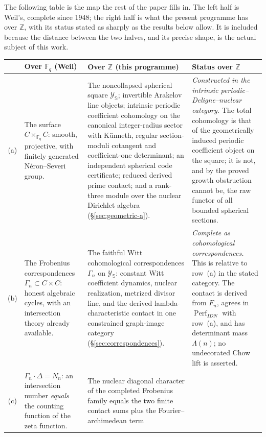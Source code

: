 \documentclass[11pt]{amsart}
\theoremstyle{definition}
\theoremstyle{remark}
\newcommand{\Z}{\mathbb Z}
\begin{document}
The following table is the map the rest of the paper fills in.  The left
half is Weil's, complete since 1948; the right half is what the present
programme has over $\Z$, with its status stated as sharply as the results
below allow.  It is included because the distance between the two halves,
and its precise shape, is the actual subject of this work.

\begingroup
\footnotesize
\setlength{\tabcolsep}{4pt}
\renewcommand{\arraystretch}{1.25}
\noindent
\begin{tabularx}{\textwidth}{@{}c p{} p{} Y@{}}
\toprule
 & \textbf{Over $\mathbb F_q$ (Weil)} & \textbf{Over $\Z$ (this programme)}
 & \textbf{Status over $\Z$} \\
\midrule
(a) &
The surface $C\times_{\mathbb F_q}C$: smooth, projective, with finitely
generated Néron--Severi group. &
The noncollapsed spherical square $\mathscr Y_{\mathbb S}$; invertible
Arakelov line objects; intrinsic periodic coefficient cohomology on the
canonical integer-radius sector with
K\"unneth, regular section-moduli cotangent and coefficient-one determinant;
an independent spherical code certificate; reduced derived prime contact; and a
rank-three module over the nuclear Dirichlet algebra
(\S\ref{sec:geometric-a}). &
\emph{Constructed in the intrinsic periodic--Deligne--nuclear category.}
The total cohomology is that of the geometrically induced periodic
coefficient object on the square; it is not, and by the proved growth
obstruction cannot be, the raw functor of all bounded spherical sections.
\\
\addlinespace
(b) &
The Frobenius correspondences $\Gamma_n\subset C\times C$: honest algebraic
cycles, with an intersection theory already available. &
The faithful Witt cohomological correspondences $\Gamma_n$ on
$\mathscr Y_{\mathbb S}$: constant Witt coefficient dynamics, nuclear
realization, metrized divisor line, and the derived
lambda-characteristic contact
in one constrained graph-image category (\S\ref{sec:correspondences}). &
\emph{Complete as cohomological correspondences.}  This is relative to
row~(a) in the stated category.  The contact is derived from $F_n$, agrees
in $\operatorname{Perf}_{IDN}$ with row~(a), and has determinant mass
$\Lambda(n)$; no
undecorated Chow lift is asserted. \\
\addlinespace
(c) &
$\Gamma_n\cdot\Delta=N_n$: an intersection number \emph{equals} the counting
function of the zeta function. &
The nuclear diagonal character of the completed Frobenius family equals
the two finite contact sums plus the Fourier--archimedean term

\end{tabularx}
\end{document}
